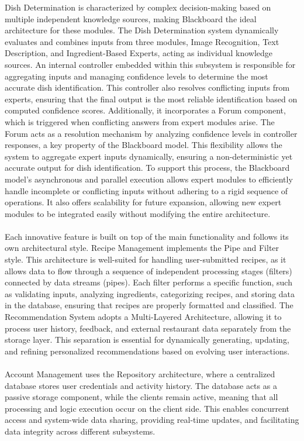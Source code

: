 \documentclass[]{article}
\begin{document}
Dish Determination is characterized by complex decision-making based on multiple independent knowledge sources, making Blackboard the ideal architecture for these modules. The Dish Determination system dynamically evaluates and combines inputs from three modules, Image Recognition, Text Description, and Ingredient-Based Experts, acting as individual knowledge sources. An internal controller embedded within this subsystem is responsible for aggregating inputs and managing confidence levels to determine the most accurate dish identification. This controller also resolves conflicting inputs from experts, ensuring that the final output is the most reliable identification based on computed confidence scores. Additionally, it incorporates a Forum component, which is triggered when conflicting answers from expert modules arise. The Forum acts as a resolution mechanism by analyzing confidence levels in controller responses, a key property of the Blackboard model. This flexibility allows the system to aggregate expert inputs dynamically, ensuring a non-deterministic yet accurate output for dish identification.  To support this process, the Blackboard model’s asynchronous and parallel execution allows expert modules to efficiently handle incomplete or conflicting inputs without adhering to a rigid sequence of operations. It also offers scalability for future expansion, allowing new expert modules to be integrated easily without modifying the entire architecture.
\\
\\
Each innovative feature is built on top of the main functionality and follows its own architectural style. Recipe Management implements the Pipe and Filter style. This architecture is well-suited for handling user-submitted recipes, as it allows data to flow through a sequence of independent processing stages (filters) connected by data streams (pipes). Each filter performs a specific function, such as validating inputs, analyzing ingredients, categorizing recipes, and storing data in the database, ensuring that recipes are properly formatted and classified. The Recommendation System adopts a Multi-Layered Architecture, allowing it to process user history, feedback, and external restaurant data separately from the storage layer. This separation is essential for dynamically generating, updating, and refining personalized recommendations based on evolving user interactions.
\\
\\
Account Management uses the Repository architecture, where a centralized database stores user credentials and activity history. The database acts as a passive storage component, while the clients remain active, meaning that all processing and logic execution occur on the client side. This enables concurrent access and system-wide data sharing, providing real-time updates, and facilitating data integrity across different subsystems.
\end{document}
